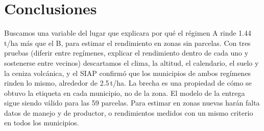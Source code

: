 \section{Conclusiones}\label{sec:conclusiones}

Buscamos una variable del lugar que explicara por qué el régimen A rinde 1.44\,t/ha más que el B, para estimar el
rendimiento en zonas sin parcelas. Con tres pruebas (diferir entre regímenes, explicar el rendimiento dentro de cada
uno y sostenerse entre vecinos) descartamos el clima, la altitud, el calendario, el suelo y la ceniza volcánica, y el
SIAP confirmó que los municipios de ambos regímenes rinden lo mismo, alrededor de 2.5\,t/ha. La brecha es una
propiedad de cómo se obtuvo la etiqueta en cada municipio, no de la zona. El modelo de la entrega sigue siendo válido
para las 59 parcelas. Para estimar en zonas nuevas harán falta datos de manejo y de productor, o rendimientos medidos
con un mismo criterio en todos los municipios.
